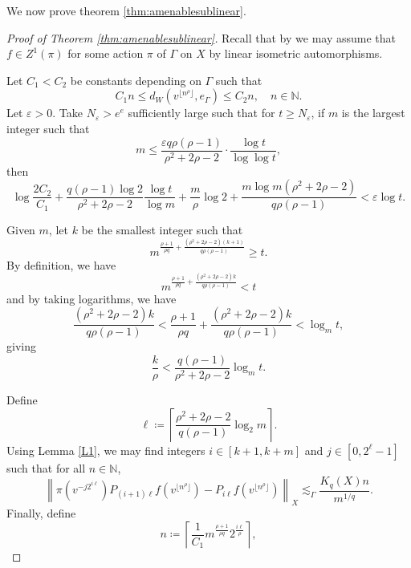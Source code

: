 \documentclass[11pt,reqno]{amsart}
\newcommand{\1}{\mathbf 1}
\begin{document}
We now prove theorem \ref{thm:amenablesublinear}.
\begin{proof}[Proof of Theorem \ref{thm:amenablesublinear}]
Recall that by \cite[Theorem 9.1]{naor2011lp} we may assume that $f\in Z^1\left(\pi\right)$ for some action $\pi$ of $\Gamma$ on $X$ by linear isometric automorphisms.



Let $C_1<C_2$ be constants depending on $\Gamma$ such that
\[
C_1n\le d_W\left(v^{\lfloor n^\rho\rfloor},e_\Gamma\right)\le C_2 n,\quad n\in \mathbb{N}.
\]
Let $\varepsilon>0$. Take $N_\varepsilon>e^e$ sufficiently large such that for $t\ge N_\varepsilon$, if $m$ is the largest integer such that
\[
m\le \frac{\varepsilon q\rho\left(\rho-1\right)}{\rho^2+2\rho-2} \cdot \frac{\log t}{\log\log t},
\]
then
\begin{equation}\label{eq:def m}
\log\frac{2C_2}{C_1}+\frac{q\left(\rho-1\right)\log 2}{\rho^2+2\rho-2}\frac{\log t}{\log m}+\frac{m}{\rho}\log 2+\frac{m\log m\left(\rho^2+2\rho-2\right)}{q\rho\left(\rho-1\right)}<\varepsilon \log t.
\end{equation}

Given $m$, let $k$ be the smallest integer such that
\begin{equation}\label{eq:def k}
m^{\frac{\rho+1}{\rho q}+\frac{\left(\rho^2+2\rho-2\right)\left(k+1\right)}{q\rho\left(\rho-1\right)}}\ge t.
\end{equation}
By definition, we have
\begin{equation}\label{eq:def k-2}
    m^{\frac{\rho+1}{\rho q}+\frac{\left(\rho^2+2\rho-2\right)k}{q\rho\left(\rho-1\right)}}< t
\end{equation}
and by taking logarithms, we have
\[
\frac{\left(\rho^2+2\rho-2\right)k}{q\rho\left(\rho-1\right)}<\frac{\rho+1}{\rho q}+\frac{\left(\rho^2+2\rho-2\right)k}{q\rho\left(\rho-1\right)}< \log_m t,
\]
giving
\begin{equation}\label{eq:prop k}
    \frac{k}{\rho}<\frac{q\left(\rho-1\right)}{\rho^2+2\rho-2}\log_mt.
\end{equation}

Define
\begin{equation}\label{eq:def l}
\ell\coloneqq \left\lceil\frac{\rho^2+2\rho-2}{q\left(\rho-1\right)}\log_2m\right\rceil.
\end{equation}
Using Lemma \ref{L1}, we may find integers $i\in \left[k+1,k+m\right]$ and $j\in \left[0,2^\ell-1\right]$ such that for all $n\in \mathbb{N}$,
\begin{equation}\label{eq:asymptotic}
\left\|\pi\left(v^{-j2^{i\ell}}\right)P_{\left(i+1\right)\ell}f\left(v^{\lfloor n^\rho\rfloor}\right)-P_{i\ell}f\left(v^{\lfloor n^\rho\rfloor}\right)\right\|_X\lesssim_\Gamma \frac{K_q\left(X\right)n}{m^{1/q}}.
\end{equation}
Finally, define
\begin{equation}\label{eq:def n}
n\coloneqq \left\lceil\frac1{C_1} m^{\frac{\rho+1}{\rho q}}2^{\frac{i\ell}{\rho}}\right\rceil,
\end{equation}





\end{proof}
\end{document}
